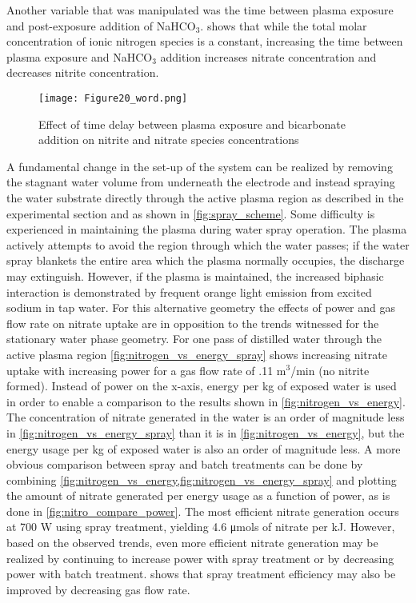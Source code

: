 Another variable that was manipulated was the time between plasma exposure and post-exposure addition of NaHCO$_3$.  shows that while the total molar concentration of ionic nitrogen species is a constant, increasing the time between plasma exposure and NaHCO$_3$ addition increases nitrate concentration and decreases nitrite concentration.

\begin{figure}[htbp]
  \centering
  \texttt{[image: Figure20\_word.png]}
  \caption{Effect of time delay between plasma exposure and bicarbonate addition on nitrite and nitrate species concentrations}
  \label{fig:nitrogen_vs_time_delay}
\end{figure}

A fundamental change in the set-up of the system can be realized by removing the stagnant water volume from underneath the electrode and instead spraying the water substrate directly through the active plasma region as described in the experimental section and as shown in \cref{fig:spray_scheme}.  Some difficulty is experienced in maintaining the plasma during water spray operation.  The plasma actively attempts to avoid the region through which the water passes; if the water spray blankets the entire area which the plasma normally occupies, the discharge may extinguish.  However, if the plasma is maintained, the increased biphasic interaction is demonstrated by frequent orange light emission from excited sodium in tap water.  For this alternative geometry the effects of power and gas flow rate on nitrate uptake are in opposition to the trends witnessed for the stationary water phase geometry.   For one pass of distilled water through the active plasma region \cref{fig:nitrogen_vs_energy_spray} shows increasing nitrate uptake with increasing power for a gas flow rate of .11 m$^3$/min (no nitrite formed).  Instead of power on the x-axis, energy per kg of exposed water is used in order to enable a comparison to the results shown in \cref{fig:nitrogen_vs_energy}.  The concentration of nitrate generated in the water is an order of magnitude less in \cref{fig:nitrogen_vs_energy_spray} than it is in \cref{fig:nitrogen_vs_energy}, but the energy usage per kg of exposed water is also an order of magnitude less.  A more obvious comparison between spray and batch treatments can be done by combining \cref{fig:nitrogen_vs_energy,fig:nitrogen_vs_energy_spray} and plotting the amount of nitrate generated per energy usage as a function of power, as is done in \cref{fig:nitro_compare_power}.  The most efficient nitrate generation occurs at 700 W using spray treatment, yielding 4.6 μmols of nitrate per kJ.  However, based on the observed trends, even more efficient nitrate generation may be realized by continuing to increase power with spray treatment or by decreasing power with batch treatment.   shows that spray treatment efficiency may also be improved by decreasing gas flow rate.

